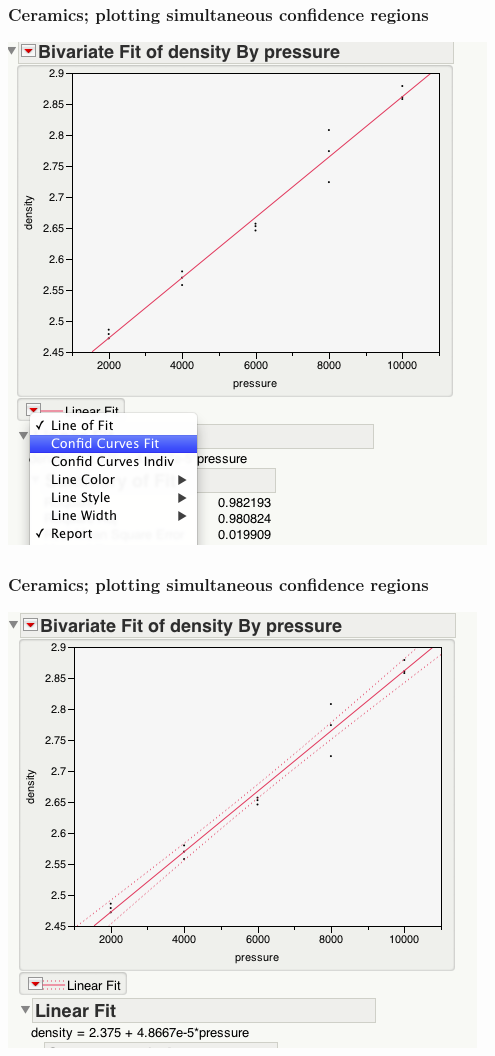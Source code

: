 \documentclass[handout]{beamer}\usepackage[]{graphicx}\usepackage[]{color}
\numberwithin{equation}{section}
\begin{document}
\begin{frame}
\frametitle{Ceramics; plotting simultaneous confidence regions}
 \includegraphics{../../fig/scp1.png}
\end{frame}


\begin{frame}
\frametitle{Ceramics; plotting simultaneous confidence regions}
 \includegraphics{../../fig/scp2.png}
\end{frame}
\end{document}
